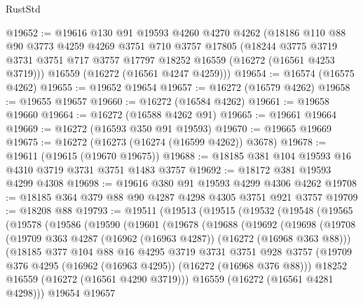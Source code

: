 \begin{lexlean}{RustStd}
\begin{coremodule}
@19652 := @19616
    @130
    @91
    @19593
    @4260
    @4270
    @4262
    (@18186
      @110
      @88
      @90
      @3773
      @4259
      @4269
      @3751
      @710
      @3757
      @17805
      (@18244 @3775 @3719 @3731 @3751 @717 @3757 @17797 @18252 @16559 (@16272 (@16561 @4253 @3719)))
      @16559
      (@16272 (@16561 @4247 @4259)))
@19654 := @16574 (@16575 @4262)
@19655 := @19652 @19654
@19657 := @16272 (@16579 @4262)
@19658 := @19655 @19657
@19660 := @16272 (@16584 @4262)
@19661 := @19658 @19660
@19664 := @16272 (@16588 @4262 @91)
@19665 := @19661 @19664
@19669 := @16272 (@16593 @350 @91 @19593)
@19670 := @19665 @19669
@19675 := @16272 (@16273 (@16274 (@16599 @4262)) @3678)
@19678 := @19611 (@19615 (@19670 @19675))
@19688 := @18185 @381 @104 @19593 @16 @4310 @3719 @3731 @3751 @1483 @3757
@19692 := @18172 @381 @19593 @4299 @4308
@19698 := @19616 @380 @91 @19593 @4299 @4306 @4262
@19708 := @18185 @364 @379 @88 @90 @4287 @4298 @4305 @3751 @921 @3757
@19709 := @18208 @88
@19793 := @19511
    (@19513
      (@19515
        (@19532
          (@19548
            (@19565
              (@19578
                (@19586
                  (@19590
                    (@19601
                      (@19678
                        (@19688
                          (@19692
                            (@19698
                              (@19708
                                (@19709
                                  @363
                                  @4287
                                  (@16962 (@16963 @4287))
                                  (@16272 (@16968 @363 @88)))
                                (@18185
                                  @377
                                  @104
                                  @88
                                  @16
                                  @4295
                                  @3719
                                  @3731
                                  @3751
                                  @928
                                  @3757
                                  (@19709
                                    @376
                                    @4295
                                    (@16962 (@16963 @4295))
                                    (@16272 (@16968 @376 @88)))
                                  @18252
                                  @16559
                                  (@16272 (@16561 @4290 @3719)))
                                @16559
                                (@16272 (@16561 @4281 @4298)))
                              @19654
                              @19657

\end{coremodule}
\end{lexlean}

